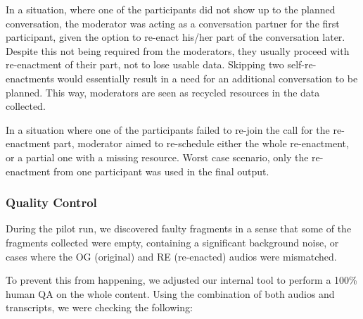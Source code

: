 In a situation, where one of the participants did not show up to the planned conversation, the moderator was acting as a conversation partner for the first participant, given the option to re-enact his/her part of the conversation later. Despite this not being required from the moderators, they usually proceed with re-enactment of their part, not to lose usable data. Skipping two self-re-enactments would essentially result in a need for an additional conversation to be planned. This way, moderators are seen as recycled resources in the data collected. 

In a situation where one of the participants failed to re-join the call for the re-enactment part, moderator aimed to re-schedule either the whole re-enactment, or a partial one with a missing resource. Worst case scenario, only the re-enactment from one participant was used in the final output. 

\subsubsection{Quality Control}

During the pilot run, we discovered faulty fragments in a sense that some of the fragments collected were empty, containing a significant background noise, or cases where the OG (original) and RE (re-enacted) audios were mismatched. 

To prevent this from happening, we adjusted our internal tool to perform a 100\% human QA on the whole content. Using the combination of both audios and transcripts, we were checking the following: 

